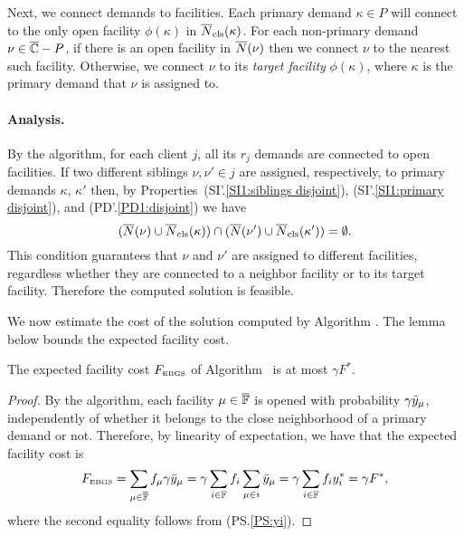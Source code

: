 Next, we connect demands to facilities.
Each primary demand $\kappa\in P$ will connect
to the only open facility $\phi(\kappa)$ in ${\overline{N}}_{{\mbox{\scriptsize\rm cls}}}(\kappa)$.  
For each non-primary demand $\nu\in \overline{\mathbb{C}} - P$, if
there is an open facility in ${\overline{N}}(\nu)$ then we connect
$\nu$ to the nearest such facility. Otherwise, we connect
$\nu$ to its \emph{target facility} $\phi(\kappa)$, where $\kappa$ is the primary
demand that $\nu$ is assigned to. 


\paragraph{Analysis.}
By the algorithm, for each client $j$, all its $r_j$ demands are connected to
open facilities. If two different siblings $\nu,\nu'\in j$ are assigned, respectively,
to primary demands $\kappa$, $\kappa'$ then, by
Properties~(SI'.\ref{SI1:siblings disjoint}), (SI'.\ref{SI1:primary
  disjoint}), and (PD'.\ref{PD1:disjoint}) we have
%
\begin{equation*}
( {\overline{N}}(\nu) \cup {\overline{N}}_{{\mbox{\scriptsize\rm cls}}}(\kappa)) \cap ({\overline{N}}(\nu')\cup {\overline{N}}_{{\mbox{\scriptsize\rm cls}}}(\kappa')) = \emptyset.
\end{equation*}
%
This condition guarantees that $\nu$ and $\nu'$ are assigned to different facilities,
regardless whether they are connected to a neighbor facility or to its target facility.
Therefore the computed solution is feasible.

\smallskip

We now estimate the cost of the solution computed by Algorithm {\EBGS}. The lemma
below bounds the expected facility cost.

\begin{lemma} \label{lem: EBGS facility cost}
The expected facility cost $F_{\mbox{\tiny\rm EBGS}}$ of Algorithm~{\EBGS} is at most $\gamma F^\ast$.
\end{lemma}

\begin{proof}
By the algorithm, each facility $\mu\in \overline{\mathbb{F}}$ is opened with
probability $\gamma {\bar y}_{\mu}$, independently of whether it belongs to the
close neighborhood of a primary demand or not. Therefore, by
  linearity of expectation, we have that the expected facility cost is
%
\begin{equation*}
	F_{\mbox{\tiny\rm EBGS}} = \sum_{\mu \in \overline{\mathbb{F}}} f_\mu \gamma {\bar y}_{\mu} 
			= \gamma \sum_{i\in \mathbb{F}} f_i \sum_{\mu\in i} {\bar y}_{\mu} 
			= \gamma \sum_{i \in \mathbb{F}} f_i y_i^\ast = \gamma F^\ast,
\end{equation*}
%
where the second equality follows from (PS.\ref{PS:yi}).
\end{proof}

